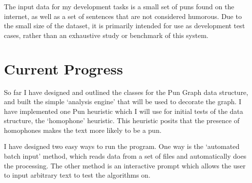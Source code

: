 The input data for my development tasks is a small set of puns found on the internet, as well as a set of sentences that are not considered humorous. Due to the small size of the dataset, it is primarily intended for use as development test cases, rather than an exhaustive study or benchmark of this system.

\section{Current Progress}

So far I have designed and outlined the classes for the Pun Graph data structure, and built the simple `analysis engine' that will be used to decorate the graph. I have implemented one Pun heuristic which I will use for initial tests of the data structure, the `homophone' heuristic. This heuristic posits that the presence of homophones makes the text more likely to be a pun.

I have designed two easy ways to run the program. One way is the `automated batch input' method, which reads data from a set of files and automatically does the processing. The other method is an interactive prompt which allows the user to input arbitrary text to test the algorithms on.
















